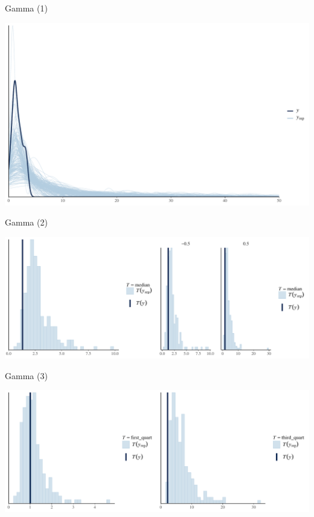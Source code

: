 \documentclass[ignorenonframetext,a4paper]{beamer}
\begin{document}
\begin{frame}{Gamma (1)}

\includegraphics{DB_presentation_case_study_files/figure-beamer/unnamed-chunk-20-1.pdf}

\end{frame}

\begin{frame}{Gamma (2)}

\includegraphics{DB_presentation_case_study_files/figure-beamer/unnamed-chunk-21-1.pdf}

\end{frame}

\begin{frame}{Gamma (3)}

\includegraphics{DB_presentation_case_study_files/figure-beamer/unnamed-chunk-22-1.pdf}

\end{frame}
\end{document}
